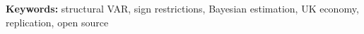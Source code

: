 \documentclass[11pt]{article}
\begin{document}
\medskip
\noindent\textbf{Keywords:} structural VAR, sign restrictions, Bayesian estimation, UK economy, replication, open source

\newpage













\end{document}
